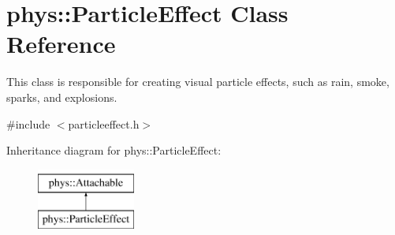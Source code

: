 \hypertarget{classphys_1_1ParticleEffect}{
\section{phys::ParticleEffect Class Reference}
\label{d2/d69/classphys_1_1ParticleEffect}
}


This class is responsible for creating visual particle effects, such as rain, smoke, sparks, and explosions.  




{\ttfamily \#include $<$particleeffect.h$>$}

Inheritance diagram for phys::ParticleEffect:\begin{figure}[H]
\begin{center}
\leavevmode
\includegraphics[height=2.000000cm]{d2/d69/classphys_1_1ParticleEffect}
\end{center}
\end{figure}
